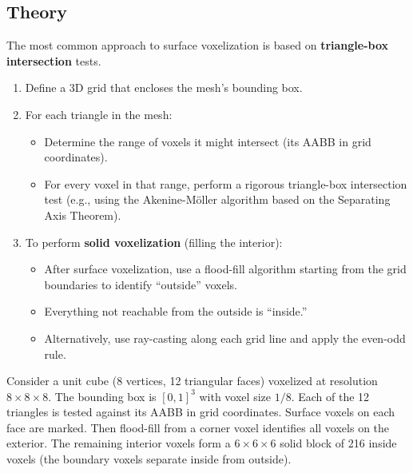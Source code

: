 \subsection{Theory}
The most common approach to surface voxelization is based on \textbf{triangle-box intersection} tests\cite{akeninemoller2001}.
\begin{enumerate}
\item Define a 3D grid that encloses the mesh's bounding box.
\item For each triangle in the mesh:
  \begin{itemize}
  \item Determine the range of voxels it might intersect (its AABB in grid coordinates).
  \item For every voxel in that range, perform a rigorous triangle-box intersection test (e.g., using the Akenine-M\"oller algorithm based on the Separating Axis Theorem).
  \end{itemize}
\item To perform \textbf{solid voxelization} (filling the interior):
  \begin{itemize}
  \item After surface voxelization, use a flood-fill algorithm starting from the grid boundaries to identify ``outside'' voxels\cite{nooruddin2003}.
  \item Everything not reachable from the outside is ``inside.''
  \item Alternatively, use ray-casting along each grid line and apply the even-odd rule.
  \end{itemize}
\end{enumerate}

\begin{example}\label{ex:voxelize_cube}
Consider a unit cube (8 vertices, 12 triangular faces) voxelized at resolution $8 \times 8 \times 8$. The bounding box is $[0,1]^3$ with voxel size $1/8$. Each of the 12 triangles is tested against its AABB in grid coordinates. Surface voxels on each face are marked. Then flood-fill from a corner voxel identifies all voxels on the exterior. The remaining interior voxels form a $6 \times 6 \times 6$ solid block of 216 inside voxels (the boundary voxels separate inside from outside).
\end{example}

